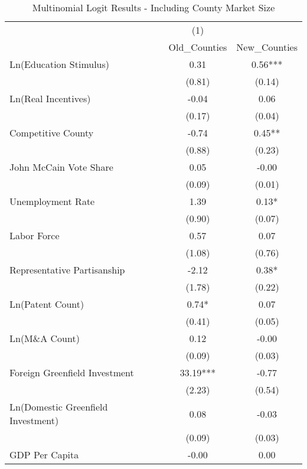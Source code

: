 \begin{table}[!htbp]\centering
\def\sym#1{\ifmmode^{#1}\else\(^{#1}\)\fi}
\caption{Multinomial Logit Results - Including County Market Size}
\begin{tabular}{l*{2}{c}}
\hline\hline
                    &         (1)   &               \\
                    &Old_Counties   &New_Counties   \\
\hline
Ln(Education Stimulus)&        0.31   &        0.56***\\
                    &      (0.81)   &      (0.14)   \\
Ln(Real Incentives) &       -0.04   &        0.06   \\
                    &      (0.17)   &      (0.04)   \\
Competitive County  &       -0.74   &        0.45** \\
                    &      (0.88)   &      (0.23)   \\
John McCain Vote Share&        0.05   &       -0.00   \\
                    &      (0.09)   &      (0.01)   \\
Unemployment Rate   &        1.39   &        0.13*  \\
                    &      (0.90)   &      (0.07)   \\
Labor Force         &        0.57   &        0.07   \\
                    &      (1.08)   &      (0.76)   \\
Representative Partisanship&       -2.12   &        0.38*  \\
                    &      (1.78)   &      (0.22)   \\
Ln(Patent Count)    &        0.74*  &        0.07   \\
                    &      (0.41)   &      (0.05)   \\
Ln(M\&A Count)      &        0.12   &       -0.00   \\
                    &      (0.09)   &      (0.03)   \\
Foreign Greenfield Investment&       33.19***&       -0.77   \\
                    &      (2.23)   &      (0.54)   \\
Ln(Domestic Greenfield Investment)&        0.08   &       -0.03   \\
                    &      (0.09)   &      (0.03)   \\
GDP Per Capita      &       -0.00   &        0.00   \\

\end{tabular}
\end{table}
